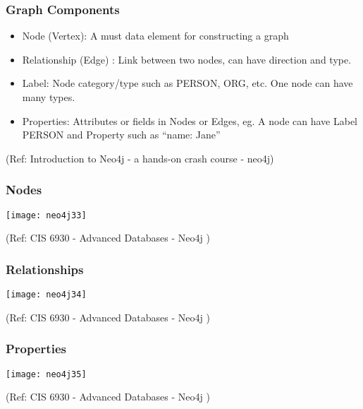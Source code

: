 \begin{frame}\frametitle{Graph Components}

\begin{itemize}
\item Node (Vertex): A must data element for constructing a graph
\item Relationship (Edge) : Link between two nodes, can have direction and type.
\item Label: Node category/type such as PERSON, ORG, etc. One node can have many types.
\item Properties: Attributes or fields in Nodes or Edges, eg. A node can have Label PERSON and Property such as ``name: Jane''
\end{itemize}



{\tiny (Ref: Introduction to Neo4j - a hands-on crash course - neo4j)}
\end{frame}




\begin{frame}\frametitle{Nodes}


\begin{center}
\texttt{[image: neo4j33]}
\end{center}	

{\tiny (Ref: CIS 6930 - Advanced Databases - Neo4j )}
\end{frame}


\begin{frame}\frametitle{Relationships}


\begin{center}
\texttt{[image: neo4j34]}
\end{center}	

{\tiny (Ref: CIS 6930 - Advanced Databases - Neo4j )}
\end{frame}

\begin{frame}\frametitle{Properties}


\begin{center}
\texttt{[image: neo4j35]}
\end{center}	

{\tiny (Ref: CIS 6930 - Advanced Databases - Neo4j )}
\end{frame}



